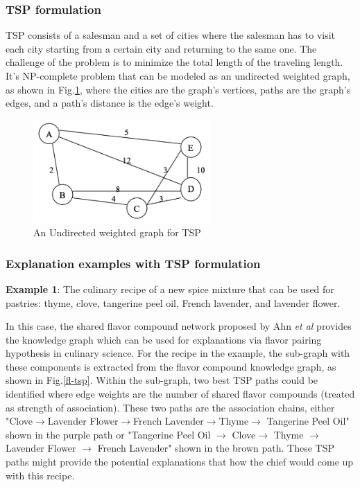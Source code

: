 \documentclass[]{article}
\newcommand{\etal}{\textit{et al}}
\begin{document}
\subsubsection{TSP formulation}
TSP consists of a salesman and a set of cities where the salesman has to visit each city starting from a certain city and returning to the same one. The challenge of the problem is to minimize the total length of the traveling length.  
It's NP-complete problem that can be modeled as an undirected weighted graph, as shown in Fig.\ref{fig:tsp}, where the cities are the graph's vertices, paths are the graph's edges, and a path's distance is the edge's weight. 

\begin{figure}[htbp]
\centering
\includegraphics[width=0.6\textwidth]{FIGS/tsp-graph.png}
\caption{An Undirected weighted graph for TSP}
\label{fig:tsp}
\end{figure}

\subsubsection{Explanation examples with TSP formulation}
\textbf{Example 1}: The culinary recipe of a new spice mixture that can be used for pastries: thyme, clove, tangerine peel oil, French lavender, and lavender flower.

In this case, the shared flavor compound network proposed by Ahn \etal\cite{b3} provides the knowledge graph which can be used for explanations via flavor pairing hypothesis in culinary science. 
For the recipe in the example, the sub-graph with these components is extracted from the flavor compound knowledge graph, as shown in Fig.\ref{fl-tsp}. 
Within the sub-graph, two best TSP paths could be identified where edge weights are the number of shared flavor compounds (treated as strength of association). 
These two paths are the association chains, either "Clove$\rightarrow$Lavender Flower$\rightarrow$French Lavender$\rightarrow$Thyme$\rightarrow$ Tangerine Peel Oil" shown in the purple path or "Tangerine Peel Oil $\rightarrow$ Clove$\rightarrow$ Thyme $\rightarrow$ Lavender Flower $\rightarrow$ French Lavender" shown in the brown path. 
These TSP paths might provide the potential explanations that how the chief would come up with this recipe. 
\end{document}
